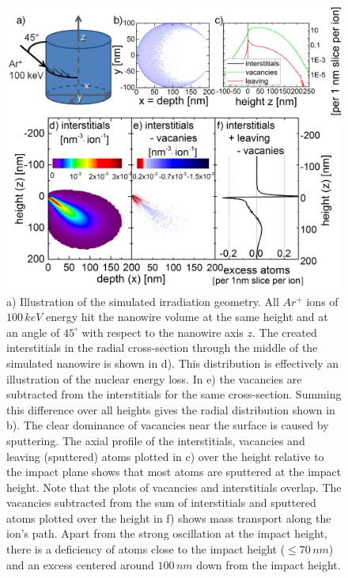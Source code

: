 \clearpage
\begin{figure}[thbp]
	\centering
		\includegraphics[width=.9\textwidth]{images/deformationBCA.jpg}
		\caption{a) Illustration of the simulated irradiation geometry. All $Ar^+$ ions of $100\,keV$ energy hit the nanowire volume at the same height and at an angle of $45^\circ$ with respect to the nanowire axis $z$. The created interstitials in the radial cross-section through the middle of the simulated nanowire is shown in d). This distribution is effectively an illustration of the nuclear energy loss. In e) the vacancies are subtracted from the interstitials for the same cross-section. Summing this difference over all heights gives the radial distribution shown in b). The clear dominance of vacancies near the surface is caused by sputtering. The axial profile of the interstitials, vacancies and leaving (sputtered) atoms plotted in c) over the height relative to the impact plane shows that most atoms are sputtered at the impact height. Note that the plots of vacancies and interstitials overlap. The vacancies subtracted from the sum of interstitials and sputtered atoms plotted over the height in f) shows mass transport along the ion's path. Apart from the strong oscillation at the impact height, there is a deficiency of atoms close to the impact height ($\le 70\,nm$) and an excess centered around $100\,nm$ down from the impact height.} 
	\label{deformationBCA}	
\end{figure}

